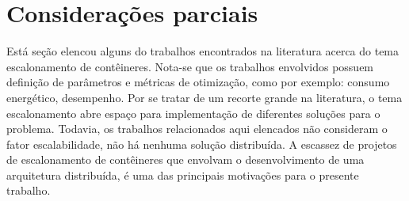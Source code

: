 \section{Considerações parciais}
Está seção elencou alguns do trabalhos encontrados na literatura acerca do tema escalonamento de contêineres. Nota-se que os trabalhos envolvidos possuem definição de parâmetros e métricas de otimização, como por exemplo: consumo energético, desempenho. Por se tratar de um recorte grande na literatura, o tema escalonamento abre espaço para implementação de diferentes soluções para o problema. Todavia, os trabalhos relacionados aqui elencados não consideram o fator escalabilidade, não há nenhuma solução distribuída. A escassez de projetos de escalonamento de contêineres que envolvam o desenvolvimento de uma arquitetura distribuída, é uma das principais motivações para o presente trabalho.
 

